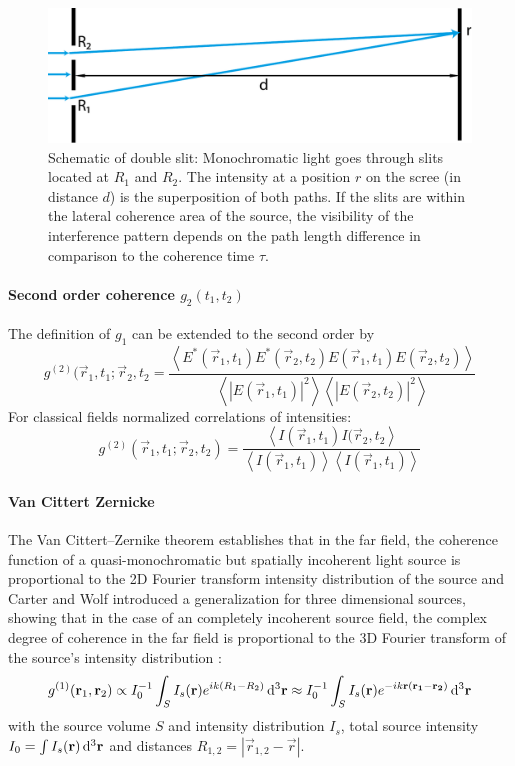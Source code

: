 \begin{figure}
	\centering
	\includegraphics[width=0.8\linewidth]{images/doubleslit.pdf}
	\caption[Schematic of double slit]{Schematic of double slit: Monochromatic light goes through slits located at $R_1$ and $R_2$. The intensity at a position $r$ on the scree (in distance $d$) is the superposition of both paths.  If the slits are within the lateral coherence area of the source, the visibility of the interference pattern depends on the path length difference in comparison to the coherence time $\tau$.}
	\label{fig:doubleslit}
\end{figure}


\paragraph{Second order coherence $g_2(t_1,t_2)$}
The definition of $g_1$ can be extended to the second order by
\begin{equation*}
	g^{(2)}(\vec{r}_1,t_1;\vec{r}_2,t_2= 
	\frac{\left< E^*(\vec{r}_1,t_1)E^*(\vec{r}_2,t_2)E(\vec{r}_1,t_1)E(\vec{r}_2,t_2) \right>}{\left<\left | E(\vec{r}_1,t_1)\right |^2 \right> \left< \left |E(\vec{r}_2,t_2)\right |^2 \right>}	
\end{equation*}
For classical fields normalized correlations of intensities:
\begin{equation}
	g^{(2)}(\vec{r}_1,t_1;\vec{r}_2,t_2)= 
		\frac{\left< I(\vec{r}_1,t_1)I(\vec{r}_2,t_2 \right>}{\left<I(\vec{r}_1,t_1)\right>\left<I(\vec{r}_1,t_1)\right>}	
\end{equation}

\paragraph{Van Cittert Zernicke}
The Van Cittert–Zernike theorem establishes that in the far field, the coherence function of a 
quasi-monochromatic but spatially incoherent light source is proportional to the 2D Fourier transform intensity distribution of the source and Carter and Wolf introduced a generalization for three dimensional sources, showing that in the case of an completely incoherent source field, the complex degree of coherence in the far field is proportional to the 3D Fourier transform of the source's intensity distribution \cite{rosen1996, goodman2005, carter1981}:
\begin{equation}
	g^{(1)}(\mathbf{r}_1,\mathbf{r}_2) \propto I_0^{-1} \int_{S} I_s(\mathbf{r}) e^{ik(R_1-R_2)} \operatorname{\mathrm{d}^3 \!} \mathbf{r} \approx I_0^{-1} \int_{S} I_s(\mathbf{r}) e^{-ik\mathbf{r}(\mathbf{r_1}-\mathbf{r_2})} \operatorname{\mathrm{d}^3 \!} \mathbf{r}
\end{equation}
with the source volume $S$ and intensity distribution $I_s$, total source intensity $I_0=\int I_s(\mathbf{r}) \operatorname{\mathrm{d}^3 \!} \mathbf{r}$ and distances $R_{1,2}=\left|\vec{r}_{1,2}-\vec{r}\right|$.


